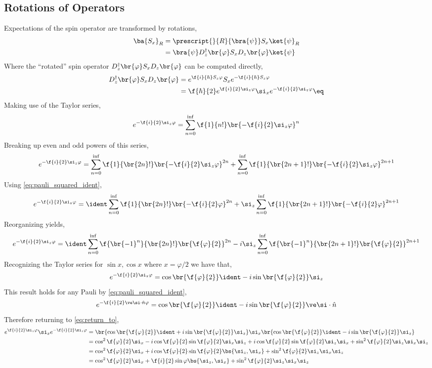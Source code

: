 \documentclass{article}
\begin{document}
\subsection{Rotations of Operators}
Expectations of the spin operator are transformed by rotations,
\begin{align*}
    \ba{S_x}_R &= \prescript{}{R}{\bra{\psi}} S_x \ket{\psi}_R \\
    &= \bra{\psi} D^{\dagger}_z\br{\varphi} S_x D_z\br{\varphi} \ket{\psi}
\end{align*}
Where the ``rotated'' spin operator $D^{\dagger}_z\br{\varphi} S_x D_z\br{\varphi}$ can be computed directly,
\begin{align*}
    D^{\dagger}_z\br{\varphi} S_x D_z\br{\varphi} &= e^{\f{i}{\hbar} S_z \varphi } S_x e^{-\f{i}{\hbar} S_z \varphi } \\
    &= \f{\hbar}{2} e^{\f{i}{2} \si_z \varphi } \si_x e^{-\f{i}{2} \si_z \varphi } \eq \label{eq:return_to}
\end{align*}
Making use of the Taylor series,
\[ e^{-\f{i}{2} \si_z \varphi} = \sum_{n=0}^{\inf} \f{1}{n!}\br{-\f{i}{2} \si_z \varphi }^n \]
Breaking up even and odd powers of this series,
\[ e^{-\f{i}{2} \si_z \varphi} = \sum_{n=0}^{\inf} \f{1}{\br{2n}!}\br{-\f{i}{2} \si_z \varphi }^{2n} + \sum_{n=0}^{\inf} \f{1}{\br{2n + 1}!}\br{-\f{i}{2} \si_z \varphi }^{2n + 1} \]
Using \cref{eq:pauli_squared_ident},
\[ e^{-\f{i}{2} \si_z \varphi} = \ident \sum_{n=0}^{\inf} \f{1}{\br{2n}!}\br{-\f{i}{2} \varphi }^{2n} + \si_z\sum_{n=0}^{\inf} \f{1}{\br{2n + 1}!}\br{-\f{i}{2} \varphi }^{2n + 1} \]
Reorganizing yields,
\[ e^{-\f{i}{2} \si_z \varphi} = \ident \sum_{n=0}^{\inf} \f{\br{-1}^n}{\br{2n}!}\br{\f{\varphi}{2}  }^{2n} - i \si_z\sum_{n=0}^{\inf} \f{\br{-1}^n}{\br{2n + 1}!}\br{\f{\varphi}{2}}^{2n + 1} \]
Recognizing the Taylor series for $\sin x, \cos x$ where $x = \varphi / 2$ we have that,
\[ e^{-\f{i}{2} \si_z \varphi} =  \cos\br{\f{\varphi}{2}}\ident - i \sin\br{\f{\varphi}{2}} \si_z \]
This result holds for any Pauli by \cref{eq:pauli_squared_ident},
\[ e^{-\f{i}{2} \ve \si \cdot \hat n \varphi} =  \cos\br{\f{\varphi}{2}}\ident - i \sin\br{\f{\varphi}{2}} \ve \si \cdot \hat n \]
Therefore returning to \cref{eq:return_to},
\begin{align*}
    e^{\f{i}{2} \si_z \varphi } \si_x e^{-\f{i}{2} \si_z \varphi } &=
    \br{\cos\br{\f{\varphi}{2}}\ident + i \sin\br{\f{\varphi}{2}} \si_z} \si_x \br{\cos\br{\f{\varphi}{2}}\ident - i \sin\br{\f{\varphi}{2}} \si_z} \\
    &= \cos^2 \f{\varphi}{2} \si_x - i \cos \f{\varphi}{2} \sin \f{\varphi}{2} \si_x \si_z + i \cos \f{\varphi}{2} \sin \f{\varphi}{2} \si_z \si_x + \sin^2 \f{\varphi}{2} \si_z \si_x \si_z \\
    &= \cos^2 \f{\varphi}{2} \si_x + i \cos \f{\varphi}{2} \sin \f{\varphi}{2} \bs{\si_z, \si_x}+ \sin^2 \f{\varphi}{2} \si_z \si_x \si_z \\
    &= \cos^2 \f{\varphi}{2} \si_x + \f{i}{2} \sin \varphi \bs{\si_z, \si_x}+ \sin^2 \f{\varphi}{2} \si_z \si_x \si_z
\end{align*}
\end{document}
